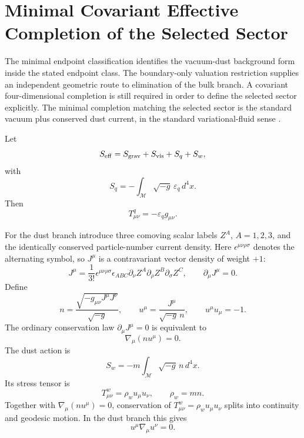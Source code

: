 \documentclass[11pt,a4paper]{article}
\def\dd{d}%
\numberwithin{equation}{section}
\theoremstyle{remark}
\newcommand{\M}{\mathcal{M}}
\newcommand{\dd}{\mathrm{d}}
\begin{document}
\section{Minimal Covariant Effective Completion of the Selected Sector}
The minimal endpoint classification identifies the vacuum-dust background form inside the stated endpoint class. The boundary-only valuation restriction supplies an independent geometric route to elimination of the bulk branch. A covariant four-dimensional completion is still required in order to define the selected sector explicitly. The minimal completion matching the selected sector is the standard vacuum plus conserved dust current, in the standard variational-fluid sense \cite{Brown1993Fluid}.

Let
\begin{equation}
S_{\rm eff}=S_{\rm grav}+S_{\rm vis}+S_q+S_w,
\end{equation}
with
\begin{equation}
S_q=-\int_{\M}\sqrt{-g}\,\varepsilon_q\,\dd^4x .
\end{equation}
Then
\begin{equation}
T^q_{\mu\nu}=-\varepsilon_q g_{\mu\nu}.
\end{equation}

For the dust branch introduce three comoving scalar labels \(Z^A\), \(A=1,2,3\), and the identically conserved particle-number current density. Here \(\epsilon^{\mu\nu\rho\sigma}\) denotes the alternating symbol, so \(J^\mu\) is a contravariant vector density of weight \(+1\):
\begin{equation}
J^\mu=\frac{1}{3!}\epsilon^{\mu\nu\rho\sigma}\epsilon_{ABC}
\partial_\nu Z^A\partial_\rho Z^B\partial_\sigma Z^C,
\qquad
\partial_\mu J^\mu=0.
\end{equation}
Define
\begin{equation}
n=\frac{\sqrt{-g_{\mu\nu}J^\mu J^\nu}}{\sqrt{-g}},
\qquad
u^\mu=\frac{J^\mu}{\sqrt{-g}\,n},
\qquad
u^\mu u_\mu=-1.
\end{equation}
The ordinary conservation law \(\partial_\mu J^\mu=0\) is equivalent to
\begin{equation}
\nabla_\mu(n u^\mu)=0.
\end{equation}
The dust action is
\begin{equation}
S_w=-m\int_{\M}\sqrt{-g}\,n\,\dd^4x .
\end{equation}
Its stress tensor is
\begin{equation}
T^w_{\mu\nu}=\rho_w u_\mu u_\nu,
\qquad
\rho_w=mn.
\end{equation}
Together with \(\nabla_\mu(nu^\mu)=0\), conservation of \(T^w_{\mu\nu}=\rho_w u_\mu u_\nu\) splits into continuity and geodesic motion. In the dust branch this gives
\begin{equation}
u^\mu\nabla_\mu u^\nu=0.
\end{equation}
\end{document}
